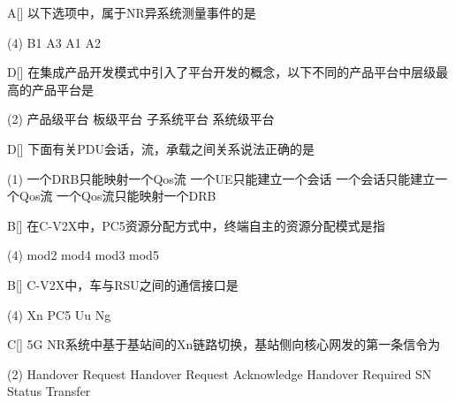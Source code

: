 \begin{choice}{A}[]
    以下选项中，属于NR异系统测量事件的是
    \begin{tasks}(4)
        \task B1
        \task A3
        \task A1
        \task A2
    \end{tasks}
\end{choice}

\begin{choice}{D}[]
    在集成产品开发模式中引入了平台开发的概念，以下不同的产品平台中层级最高的产品平台是
    \begin{tasks}(2)
        \task 产品级平台
        \task 板级平台
        \task  子系统平台
        \task 系统级平台
    \end{tasks}
\end{choice}


\begin{choice}{D}[]
    下面有关PDU会话，流，承载之间关系说法正确的是
    \begin{tasks}(1)
        \task 一个DRB只能映射一个Qos流
        \task 一个UE只能建立一个会话
        \task 一个会话只能建立一个Qos流
        \task 一个Qos流只能映射一个DRB
    \end{tasks}
\end{choice}


\begin{choice}{B}[]
    在C-V2X中，PC5资源分配方式中，终端自主的资源分配模式是指
    \begin{tasks}(4)
        \task mod2
        \task mod4
        \task mod3
        \task mod5
    \end{tasks}
\end{choice}



\begin{choice}{B}[]
    C-V2X中，车与RSU之间的通信接口是
    \begin{tasks}(4)
        \task Xn
        \task PC5
        \task Uu
        \task Ng
    \end{tasks}
\end{choice}


\begin{choice}{C}[]
    5G NR系统中基于基站间的Xn链路切换，基站侧向核心网发的第一条信令为
    \begin{tasks}(2)
        \task Handover Request
        \task Handover Request Acknowledge
        \task Handover Required
        \task SN Status Transfer
    \end{tasks}
\end{choice}


